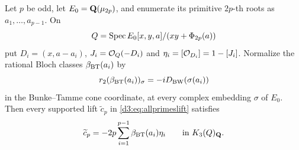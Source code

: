 \begin{lemma}\label{d3:lem:explicitoddcoefficients}
Let $p$ be odd, let $E_0=\mathbf Q(\mu_{2p})$, and enumerate its primitive
$2p$-th roots as $a_1,\ldots,a_{p-1}$. On
\[
 Q=\operatorname{Spec} E_0[x,y,a]/(xy+\Phi_{2p}(a))
\]
put $D_i=(x,a-a_i)$, $J_i=\mathcal O_Q(-D_i)$ and
$\eta_i=[\mathcal O_{D_i}]=1-[J_i]$.
Normalize the rational Bloch classes $\beta_{\rm BT}(a_i)$ by
\[
 r_2(\beta_{\rm BT}(a_i))_\sigma
   =-iD_{\rm BW}(\sigma(a_i))
\]
in the Bunke--Tamme cone coordinate, at every complex embedding
$\sigma$ of $E_0$.
Then every supported lift $\widetilde c_p$ in
\eqref{d3:eq:allprimeslift} satisfies
\begin{equation}\label{d3:eq:explicitoddcoefficient}
 \widetilde c_p=-2p\sum_{i=1}^{p-1}\beta_{\rm BT}(a_i)\eta_i
 \qquad\text{in }K_3(Q)_{\mathbf Q}.
\end{equation}
\end{lemma}

